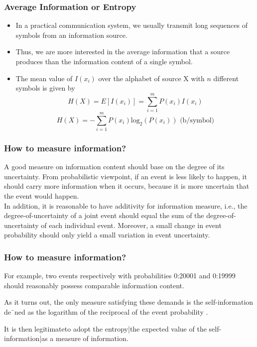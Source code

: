 \documentclass[a4]{beamer}
\begin{document}
\begin{frame}
\frametitle{Average Information or Entropy}
\begin{itemize}
\item In a practical communication system, we usually transmit long sequences of symbols from an
information source. \item Thus, we are more interested in the average information that a source produces
than the information content of a single symbol.
\item The mean value of $ I(x_i)$ over the alphabet of source X with $n$ different symbols is given by
\[ H(X) = E[I(x_i)] = \sum^m_{i=1} P(x_i)I(x_i) \]
\[ H(X) =  - \sum^m_{i=1} P(x_i)\mbox{log}_2( P(x_i) ) \mbox{        (b/symbol)}\]
\end{itemize}
\end{frame}


\begin{frame}
\frametitle{How to measure information?}
A good measure on information content
should base on the degree of its uncertainty.
From probabilistic viewpoint, if an event is less likely to happen, it should
carry more information when it occurs, because it is more uncertain that the
event would happen.\\ \bigskip In addition, it is reasonable to have additivity for information measure, i.e., the degree-of-uncertainty of a joint event should equal the sum
of the degree-of-uncertainty of each individual event. Moreover, a small change
in event probability should only yield a small variation in event uncertainty.
\end{frame}

\begin{frame}
\frametitle{How to measure information?}
For example, two events respectively with probabilities 0:20001 and 0:19999 should
reasonably possess comparable information content. 

As it turns out, the only
measure satisfying these demands is the self-information de¯ned as the logarithm
of the reciprocal of the event probability . 

It is then legitimateto adopt the entropy|the expected value of the self-information|as a measure
of information.




\end{frame}
\end{document}

